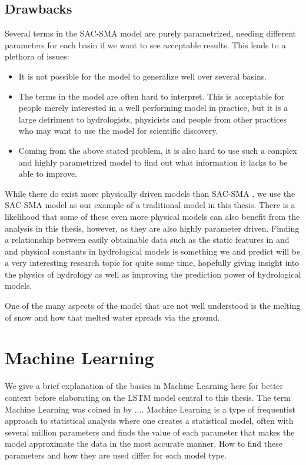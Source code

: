 \subsection{Drawbacks}
Several terms in the SAC-SMA model are purely parametrized, needing different parameters 
for each basin if we want to see acceptable results. This leads to a plethora of 
issues:
\begin{itemize}
    \item It is not possible for the model to generalize well over several basins. \citationneeded
    \item The terms in the model are often hard to interpret. This is acceptable for people merely interested in a well performing model in practice, but it is a large detriment to hydrologists, physicists and people from other practices who may want to use the model for scientific discovery.
    \item Coming from the above stated problem, it is also hard to use such a 
        complex and highly parametrized model to find out what information it lacks to be able to improve.
\end{itemize}
While there do exist more physically driven models than SAC-SMA \citationneeded, 
we use the SAC-SMA model as our example of a traditional model in this thesis. 
There is a likelihood that some of these even more physical models can also benefit 
from the analysis in this thesis, however, as they are also highly parameter 
driven. Finding a relationship between easily obtainable data such as the static 
features in \cite{CAMELS_US} and \cite{CAMELS_GB} and physical constants in 
hydrological models is something we and \citationneeded predict will be a very 
interesting research topic for quite some time, hopefully giving insight into the 
physics of hydrology as well as improving the prediction power of hydrological models.

One of the many aspects of the model that are not well understood is the melting 
of snow and how that melted water spreads via the ground. 

\section{Machine Learning}
We give a brief explanation of the basics in Machine Learning here for better context 
before elaborating on the LSTM model central to this thesis.
The term Machine Learning was coined in \citationneeded by .... 
Machine Learning is a type of frequentist approach to statistical analysis where 
one creates a statistical model, often with several million parameters and finds 
the value of each parameter that makes the model approximate the data in the most 
accurate manner. How to find these parameters and how they are used differ for each 
model type. 
